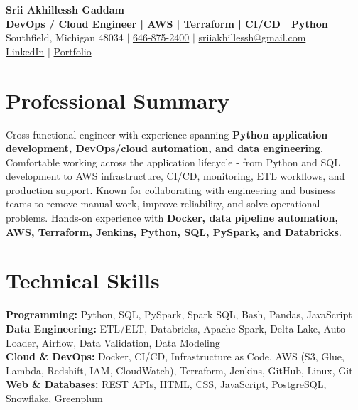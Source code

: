 \documentclass[letterpaper,10pt]{article}
\begin{document}
\fontsize{9.35pt}{10.45pt}\selectfont

\begin{center}
    {\LARGE \textbf{Srii Akhillessh Gaddam}} \\[-1pt]
    \textbf{DevOps / Cloud Engineer | AWS | Terraform | CI/CD | Python} \\[2pt]
    Southfield, Michigan 48034 $|$
    \href{tel:6468752400}{646-875-2400} $|$
    \href{mailto:sriiakhillessh@gmail.com}{sriiakhillessh@gmail.com} \\[1pt]
    \href{https://www.linkedin.com/in/srii-akhiilessh-gaddam-b48668191/}{LinkedIn} $|$
    \href{https://sriiakhillesshg.github.io/portfolio/}{Portfolio}
\end{center}
\vspace{-8pt}

\section{Professional Summary}
\small{Cross-functional engineer with experience spanning \textbf{Python application development, DevOps/cloud automation, and data engineering}. Comfortable working across the application lifecycle - from Python and SQL development to AWS infrastructure, CI/CD, monitoring, ETL workflows, and production support. Known for collaborating with engineering and business teams to remove manual work, improve reliability, and solve operational problems. Hands-on experience with \textbf{Docker, data pipeline automation, AWS, Terraform, Jenkins, Python, SQL, PySpark, and Databricks}.}

\section{Technical Skills}
\small{
\textbf{Programming:} Python, SQL, PySpark, Spark SQL, Bash, Pandas, JavaScript \\
\textbf{Data Engineering:} ETL/ELT, Databricks, Apache Spark, Delta Lake, Auto Loader, Airflow, Data Validation, Data Modeling \\
\textbf{Cloud \& DevOps:} Docker, CI/CD, Infrastructure as Code, AWS (S3, Glue, Lambda, Redshift, IAM, CloudWatch), Terraform, Jenkins, GitHub, Linux, Git \\
\textbf{Web \& Databases:} REST APIs, HTML, CSS, JavaScript, PostgreSQL, Snowflake, Greenplum
}
\end{document}
